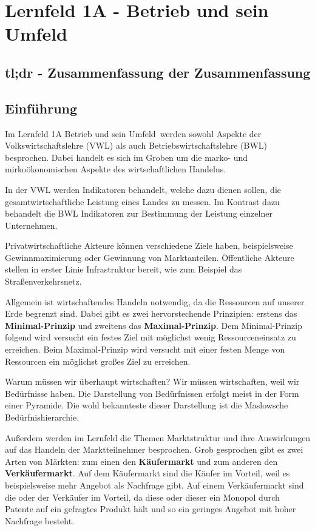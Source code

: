\section{Lernfeld 1A - Betrieb und sein Umfeld}

\subsection{tl;dr - Zusammenfassung der Zusammenfassung}

\subsection{Einführung}
Im Lernfeld 1A \ql Betrieb und sein Umfeld\qr\ werden sowohl Aspekte der Volkswirtschaftslehre (VWL) als auch Betriebswirtschaftslehre (BWL) besprochen. Dabei handelt es sich im Groben um die marko- und mirkoökonomischen Aspekte des wirtschaftlichen Handelns.

In der VWL werden Indikatoren behandelt, welche dazu dienen sollen, die gesamtwirtschaftliche Leistung eines Landes zu messen. Im Kontrast dazu behandelt die BWL Indikatoren zur Bestimmung der Leistung einzelner Unternehmen.

Privatwirtschaftliche Akteure können verschiedene Ziele haben, beispielsweise Gewinnmaximierung oder Gewinnung von Marktanteilen. Öffentliche Akteure stellen in erster Linie Infrastruktur bereit, wie zum Beispiel das Straßenverkehrsnetz.

Allgemein ist wirtschaftendes Handeln notwendig, da die Ressourcen auf unserer Erde begrenzt sind. Dabei gibt es zwei hervorstechende Prinzipien: erstens das {\bf Minimal-Prinzip} und zweitens das {\bf Maximal-Prinzip}. Dem Minimal-Prinzip folgend wird versucht ein festes Ziel mit möglichst wenig Ressourceneinsatz zu erreichen. Beim Maximal-Prinzip wird versucht mit einer festen Menge von Ressourcen ein möglichst großes Ziel zu erreichen.

Warum müssen wir überhaupt wirtschaften? Wir müssen wirtschaften, weil wir Bedürfnisse haben. Die Darstellung von Bedürfnissen erfolgt meist in der Form einer Pyramide. Die wohl bekannteste dieser Darstellung ist die Maslowsche Bedürfnishierarchie.

Außerdem werden im Lernfeld die Themen Marktstruktur und ihre Auswirkungen auf das Handeln der Marktteilnehmer besprochen. Grob gesprochen gibt es zwei Arten von Märkten: zum einen den {\bf Käufermarkt} und zum anderen den {\bf Verkäufermarkt}. Auf dem Käufermarkt sind die Käufer im Vorteil, weil es beispielsweise mehr Angebot als Nachfrage gibt. Auf einem Verkäufermarkt sind die oder der Verkäufer im Vorteil, da diese oder dieser ein Monopol durch Patente auf ein gefragtes Produkt hält und so ein geringes Angebot mit hoher Nachfrage besteht.

